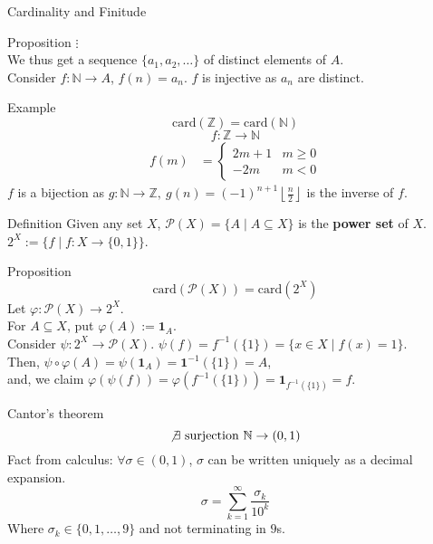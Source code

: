 \documentclass[10pt]{extarticle}
\begin{document}
\begin{problem}{Cardinality and Finitude}
\begin{problem}{Proposition}
      $\vdots$\\

      We thus get a sequence $\{a_1,a_2,\dots\}$ of distinct elements of $A$.\\

      Consider $f:\mathbb{N} \rightarrow A$, $f(n) = a_n$. $f$ is injective as $a_n$ are distinct.
    \end{problem}
    \begin{problem}{Example}
      \[
        \textrm{card}(\mathbb{Z}) = \textrm{card}(\mathbb{N})
      \] 
      \tcblower
      \[
        f:\mathbb{Z} \rightarrow \mathbb{N}
      \] 
      \begin{align*}
        f(m) &= \begin{cases}
          2m + 1 & m\geq 0\\
          -2m & m<0
        \end{cases}
      \end{align*}
      $f$ is a bijection as $g:\mathbb{N} \rightarrow \mathbb{Z},~g(n) = (-1)^{n+1}\left\lfloor \frac{n}{2}\right\rfloor$ is the inverse of $f$.
    \end{problem}
    \begin{problem}{Definition}
      Given any set $X$, $\mathcal{P}(X) = \{A \mid A\subseteq X\}$ is the \textbf{power set} of $X$.\\

      $2^X:= \{f\mid f:X\rightarrow \{0,1\}\}$.
    \end{problem}
    \begin{problem}{Proposition}
      \[
        \textrm{card}(\mathcal{P}(X)) = \textrm{card}(2^X)
      \] 
      \tcblower
      Let $\varphi: \mathcal{P}(X) \rightarrow 2^X$.\\

      For $A\subseteq X$, put $\varphi(A) := \mathbf{1}_A$.\\

      Consider $\psi: 2^X \rightarrow \mathcal{P}(X)$. $\psi(f) = f^{-1}(\{1\}) = \{x\in X \mid f(x) = 1\}$.\\

      Then, $\psi\circ\varphi(A) = \psi(\mathbf{1}_A) = \mathbf{1}^{-1}(\{1\}) = A$,\\

      and, we claim $\varphi(\psi(f)) = \varphi(f^{-1}(\{1\})) = \mathbf{1}_{f^{-1}(\{1\})} = f$.
    \end{problem}
    \begin{problem}{Cantor's theorem}
      \[
        \not\exists~\textrm{surjection}~\mathbb{N}\rightarrow (0,1)
      \] 
      \tcblower
      Fact from calculus: $\forall \sigma\in (0,1)$, $\sigma$ can be written uniquely as a decimal expansion.
      \[
        \sigma = \sum_{k=1}^{\infty} \frac{\sigma_k}{10^k}
      \] 
      Where $\sigma_k\in \{0,1,\dots,9\}$ and not terminating in $9$s.\\


\end{problem}
\end{problem}
\end{document}
